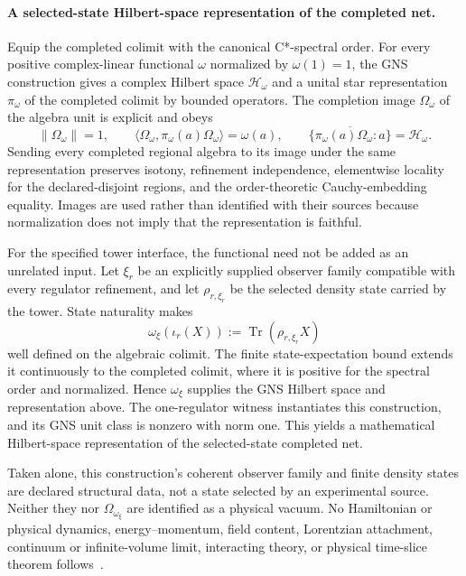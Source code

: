 \documentclass[11pt]{article}
\theoremstyle{remark}
\theoremstyle{plain}
\begin{document}
\paragraph{A selected-state Hilbert-space representation of the completed net.}
Equip the completed colimit with the canonical C*-spectral order.  For every
positive complex-linear functional \(\omega\) normalized by
\(\omega(1)=1\), the GNS construction gives a complex Hilbert space
\(\mathcal H_\omega\) and a unital star representation
\(\pi_\omega\) of the completed colimit by bounded operators.  The completion
image \(\Omega_\omega\) of the algebra unit is explicit and obeys
\[
 \|\Omega_\omega\|=1,
 \qquad
 \langle\Omega_\omega,\pi_\omega(a)\Omega_\omega\rangle
   =\omega(a),
 \qquad
 \overline{\{\pi_\omega(a)\Omega_\omega:a\}}=\mathcal H_\omega.
\]
Sending every completed regional algebra to its image under the same
representation preserves isotony, refinement independence, elementwise
locality for the declared-disjoint regions, and the
order-theoretic Cauchy-embedding equality.  Images are used rather than
identified with their sources because normalization does not imply that the
representation is faithful.

For the specified tower interface, the functional need not be added as an
unrelated input.  Let \(\xi_r\) be an explicitly supplied observer family
compatible with every regulator refinement, and let \(\rho_{r,\xi_r}\) be
the selected density state carried by the tower.  State naturality
makes
\[
  \omega_\xi(\iota_r(X))
    :=\operatorname{Tr}(\rho_{r,\xi_r}X)
\]
well defined on the algebraic colimit.  The finite state-expectation bound
extends it continuously to the completed colimit, where it is positive for
the spectral order and normalized.  Hence \(\omega_\xi\) supplies the GNS
Hilbert space and representation above. The one-regulator witness
instantiates this construction, and its GNS unit class is nonzero with norm
one. This yields a mathematical Hilbert-space representation of the
selected-state completed net.

Taken alone, this construction's coherent observer family and finite density
states are declared
structural data, not a state selected by an experimental source.  Neither
they nor \(\Omega_{\omega_\xi}\) are identified as a physical vacuum.  No
Hamiltonian or physical dynamics, energy--momentum, field content, Lorentzian
attachment, continuum or infinite-volume limit, interacting theory, or
physical time-slice theorem follows~\cite{ophrepo}.
\end{document}
